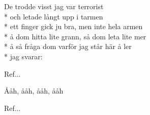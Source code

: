 \begin{SongText}[Naken]
\begin{SongVerse}
        De trodde visst jag var terrorist \\*%
        och letade långt upp i tarmen \\*%
        ett finger gick ju bra, men inte hela armen\\*%
        å dom hitta lite grann, så dom leta lite mer\\*%
        å så fråga dom varför jag står här å ler\\*%
        jag svarar:
    \end{SongVerse}
    \begin{SongVerse}
        Ref...
    \end{SongVerse}
    \begin{SongVerse}
        Ååh, ååh, ååh, ååh
    \end{SongVerse}
    \begin{SongVerse}
        Ref...
    \end{SongVerse}
\end{SongText}

